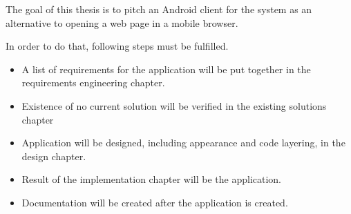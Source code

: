 The goal of this thesis is to pitch an Android client for the \etl{} system as an alternative to opening a web page in a mobile browser.

In order to do that, following steps must be fulfilled.
\begin{itemize}
    \item A list of requirements for the application will be put together in the requirements engineering chapter.
    \item Existence of no current solution will be verified in the existing solutions chapter
    \item Application will be designed, including appearance and code layering, in the design chapter.
    \item Result of the implementation chapter will be the application.
    \item Documentation will be created after the application is created.
\end{itemize}